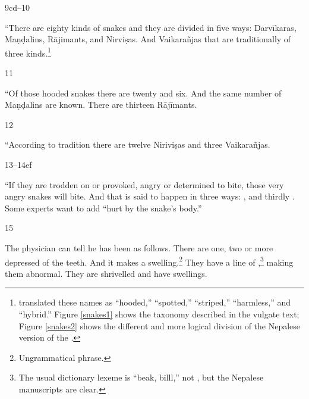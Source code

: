     \begin{translation}
        \item[9cd--10]    
        
        “There are eighty kinds of snakes and they are divided in five ways:
        Darvīkaras, Maṇḍalins, Rājimants, and Nirviṣas.  And Vaikarañjas that are
        traditionally of three kinds.\footnote{\citet{hari-2011} translated these
            names as “hooded,” “spotted,” “striped,” “harmless,” and “hybrid.” Figure 
            \ref{snakes1} shows the taxonomy described in the vulgate text; Figure 
            \ref{snakes2} shows the different and more logical division of the Nepalese 
            version of the \SS.}
            
    \item [11] 
    
    “Of those hooded snakes there are twenty and six. And the same number of
Maṇḍalins are known.  There are thirteen Rājīmants.
    
    \item [12]
    
    “According to tradition there are twelve Niriviṣas and three Vaikarañjas.
    
    \item [13--14ef]
    
“If they are trodden on or provoked, angry or determined to bite, those very
angry snakes will bite.  And that is said to happen in three ways:
,  and thirdly .  Some experts want to add “hurt by the snake's body.”

\item[15]

The physician can tell he has been  as follows. 
There are one, two or more depressed  of the teeth.  And
it makes a swelling.\footnote{Ungrammatical phrase.}  They have a line of
    ,\footnote{The usual dictionary lexeme is
         “beak, billl,” not , but the Nepalese manuscripts are
        clear.} making them abnormal. They are shrivelled and have swellings.

    
\end{translation}
